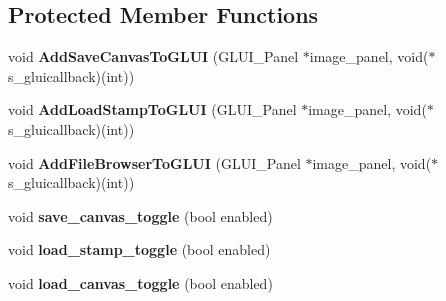 \subsection*{Protected Member Functions}
\begin{DoxyCompactItemize}
\item 
void {\bfseries Add\+Save\+Canvas\+To\+G\+L\+UI} (G\+L\+U\+I\+\_\+\+Panel $\ast$image\+\_\+panel, void($\ast$s\+\_\+gluicallback)(int))\hypertarget{classimage__tools_1_1IOManager_a600cf7d9a1b1a86cbb2201fc7ec7b528}{}\label{classimage__tools_1_1IOManager_a600cf7d9a1b1a86cbb2201fc7ec7b528}

\item 
void {\bfseries Add\+Load\+Stamp\+To\+G\+L\+UI} (G\+L\+U\+I\+\_\+\+Panel $\ast$image\+\_\+panel, void($\ast$s\+\_\+gluicallback)(int))\hypertarget{classimage__tools_1_1IOManager_a39e6a658f7d97741e09c1cec9ad08396}{}\label{classimage__tools_1_1IOManager_a39e6a658f7d97741e09c1cec9ad08396}

\item 
void {\bfseries Add\+File\+Browser\+To\+G\+L\+UI} (G\+L\+U\+I\+\_\+\+Panel $\ast$image\+\_\+panel, void($\ast$s\+\_\+gluicallback)(int))\hypertarget{classimage__tools_1_1IOManager_a078d05c79a2a954c38050aa4f4985768}{}\label{classimage__tools_1_1IOManager_a078d05c79a2a954c38050aa4f4985768}

\item 
void {\bfseries save\+\_\+canvas\+\_\+toggle} (bool enabled)\hypertarget{classimage__tools_1_1IOManager_abeb5355f6d3e08847d715dc910a2236b}{}\label{classimage__tools_1_1IOManager_abeb5355f6d3e08847d715dc910a2236b}

\item 
void {\bfseries load\+\_\+stamp\+\_\+toggle} (bool enabled)\hypertarget{classimage__tools_1_1IOManager_a6d8268c033e7aee661d3a3d7ae39f13d}{}\label{classimage__tools_1_1IOManager_a6d8268c033e7aee661d3a3d7ae39f13d}

\item 
void {\bfseries load\+\_\+canvas\+\_\+toggle} (bool enabled)\hypertarget{classimage__tools_1_1IOManager_acefb393df8796d8d2f68a0aa7a67a1eb}{}\label{classimage__tools_1_1IOManager_acefb393df8796d8d2f68a0aa7a67a1eb}


\end{DoxyCompactItemize}
